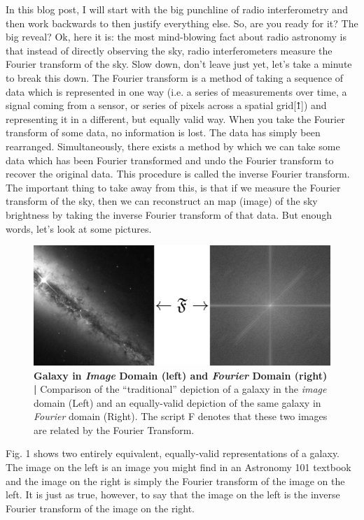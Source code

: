 \documentclass[12pt,a4paper]{article}
\begin{document}
  In this blog post, I will start with the big punchline of radio interferometry and then work backwards to then justify everything else. So, are you ready for it? The big reveal? Ok, here it is: the most mind-blowing fact about radio astronomy is that instead of directly observing the sky, radio interferometers measure the Fourier transform of the sky. Slow down, don’t leave just yet, let’s take a minute to break this down. The Fourier transform is a method of taking a sequence of data which is represented in one way (i.e. a series of measurements over time, a signal coming from a sensor, or series of pixels across a spatial grid[\^1]) and representing it in a different, but equally valid way. When you take the Fourier transform of some data, no information is lost. The data has simply been rearranged. Simultaneously, there exists a method by which we can take some data which has been Fourier transformed and undo the Fourier transform to recover the original data. This procedure is called the inverse Fourier transform. The important thing to take away from this, is that if we measure the Fourier transform of the sky, then we can reconstruct an map (image) of the sky brightness by taking the inverse Fourier transform of that data. But enough words, let’s look at some pictures.

\begin{figure}
\centering
\includegraphics[width=\textwidth]{_images/FT.png}
\caption{\textbf{Galaxy in \textit{Image} Domain (left) and \textit{Fourier} Domain (right) |} Comparison of the ``traditional'' depiction of a galaxy in the \textit{image} domain (Left) and an equally-valid depiction of the same galaxy in \textit{Fourier} domain (Right). The script F denotes that these two images are related by the Fourier Transform.}
\end{figure}

Fig. 1 shows two entirely equivalent, equally-valid representations of a galaxy. The image on the left is an image you might find in an Astronomy 101 textbook and the image on the right is simply the Fourier transform of the image on the left. It is just as true, however, to say that the image on the left is the inverse Fourier transform of the image on the right. 
	
\end{document}
